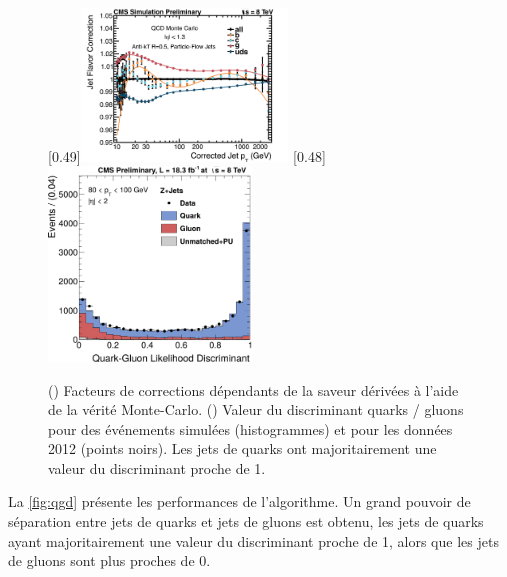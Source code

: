 \begin{figure}[tbp] \centering
    \subcaptionbox{\label{fig:flavor_response}}[0.49\textwidth]{\includegraphics[width=0.49\textwidth]{chapitre4/figs/flavor_response.pdf}}
    \subcaptionbox{\label{fig:qgd}}[0.48\textwidth]{\includegraphics[width=0.48\textwidth]{chapitre4/figs/qgd.pdf}}
    \caption{() Facteurs de corrections dépendants de la saveur dérivées à l'aide de la vérité Monte-Carlo. () Valeur du discriminant quarks / gluons pour des événements simulées (histogrammes) et pour les données 2012 (points noirs). Les jets de quarks ont majoritairement une valeur du discriminant proche de 1.}
\end{figure}

La \cref{fig:qgd} présente les performances de l'algorithme. Un grand pouvoir de séparation entre jets de quarks et jets de gluons est obtenu, les jets de quarks ayant majoritairement une valeur du discriminant proche de 1, alors que les jets de gluons sont plus proches de 0.

